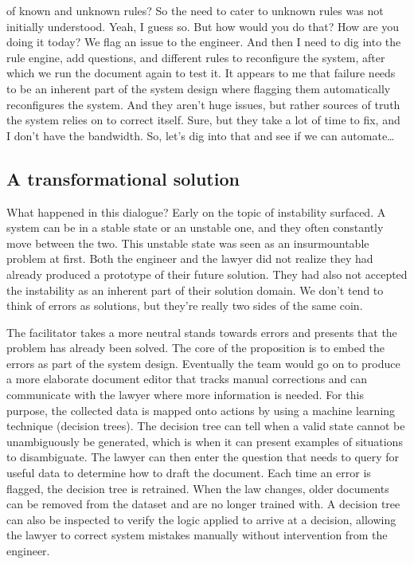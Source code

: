 \begin{dialogue}
    of known and unknown rules? So the need to cater to unknown rules was not initially understood.
     Yeah, I guess so. But how would you do that?
     How are you doing it today?
     We flag an issue to the engineer.
     And then I need to dig into the rule engine, add questions, and different rules to reconfigure
    the system, after which we run the document again to test it.
     It appears to me that failure needs to be an inherent part of the system design where
    flagging them automatically reconfigures the system. And they aren't huge issues, but rather sources of truth the
    system relies on to correct itself.
     Sure, but they take a lot of time to fix, and I don't have the bandwidth.
     So, let's dig into that and see if we can automate\ldots
\end{dialogue}

\subsection{A transformational solution}

What happened in this dialogue?
Early on the topic of instability surfaced.
A system can be in a stable state or an unstable one, and they often constantly move between the two.
This unstable state was seen as an insurmountable problem at first.
Both the engineer and the lawyer did not realize they had already produced a prototype of their future solution.
They had also not accepted the instability as an inherent part of their solution domain.
We don't tend to think of errors as solutions, but they're really two sides of the same coin.

The facilitator takes a more neutral stands towards errors and presents that the problem has already been solved.
The core of the proposition is to embed the errors as part of the system design.
Eventually the team would go on to produce a more elaborate document editor that tracks manual corrections and can
communicate with the lawyer where more information is needed.
For this purpose, the collected data is mapped onto actions by using a machine learning technique (decision trees).
The decision tree can tell when a valid state cannot be unambiguously be generated, which is when it can present
examples of situations to disambiguate.
The lawyer can then enter the question that needs to query for useful data to determine how to draft the document.
Each time an error is flagged, the decision tree is retrained.
When the law changes, older documents can be removed from the dataset and are no longer trained with.
A decision tree can also be inspected to verify the logic applied to arrive at a decision, allowing the lawyer to
correct system mistakes manually without intervention from the engineer.

